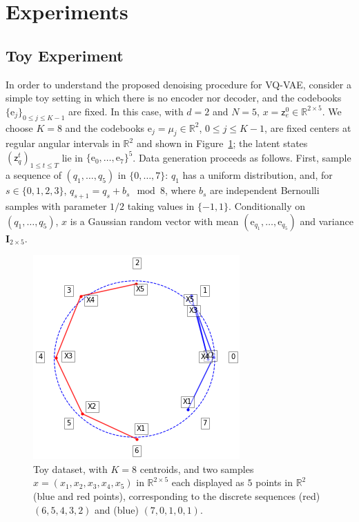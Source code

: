 \documentclass[nolayout]{article}
\theoremstyle{plain}
\theoremstyle{definition}
\theoremstyle{remark}
\newcommand{\rset}{\mathbb{R}}
\newcommand{\latentcont}{\mathsf{z}_e}
\newcommand{\latentdis}{\mathsf{z}_q}
\newcommand{\rme}{\mathrm{e}}
\newcommand{\embed}{\rme}
\begin{document}
\section{Experiments}

\subsection{Toy Experiment}
In order to understand the proposed denoising procedure for VQ-VAE, consider a simple toy setting in which there is no encoder nor decoder, and the codebooks $\{\embed_j\}_{0\leqslant j \leqslant K-1}$ are fixed. In this case, with $d=2$ and $N=5$, $x = \latentcont^0 \in \rset^{2\times 5}$. We choose $K=8$ and the codebooks $\embed_j = \mu_j \in \rset^2$, $0\leqslant j \leqslant K-1$, are fixed centers at regular angular intervals in $\rset^2$ and shown in Figure~\ref{fig:toydata}; the latent states $(\latentdis^t)_{1\leq t\leq T}$ lie in $\{\embed_0,\ldots,\embed_7\}^5$. Data generation proceeds as follows. First, sample a sequence of $(q_1,\ldots,q_5)$ in $\{0,\dots,7\}$: $q_1$ has a uniform distribution, and, for $s\in\{0,1,2,3\}$, $q_{s+1} = q_s + b_s \mod 8$, where $b_s$ are independent Bernoulli samples with parameter $1/2$ taking values in $\{-1, 1\}$. Conditionally on $(q_1,\ldots,q_5)$, $x$ is a Gaussian random vector with mean $(\embed_{q_1},\ldots,\embed_{q_5})$ and variance $\mathbf{I}_{2\times 5}$. 


\begin{figure}[h!]
    \centering
    \includegraphics[scale=0.45]{images/centroids2.png}
    \caption{Toy dataset, with $K=8$ centroids, and two samples $x = (x_1,x_2,x_3,x_4,x_5)$ in $\rset^{2 \times 5}$ each displayed as $5$ points in $\rset^{2}$ (blue and red points), corresponding to the discrete sequences (red) $(6,5,4,3,2)$ and (blue) $(7,0,1,0,1)$.}
    \label{fig:toydata}
\end{figure}
\end{document}
